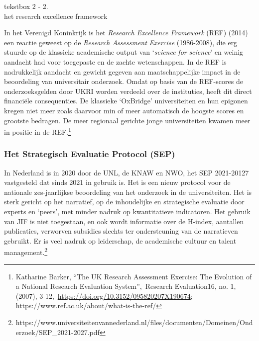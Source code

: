 \documentclass[empirical, authordate, ]{new-jote-article}
\begin{document}
	\begin{bookbox}{\raggedright tekstbox 2 - 2. \\het research excellence framework}
		In het Verenigd Koninkrijk is het \emph{Research Excellence Framework} (REF) (2014) een reactie geweest op de \emph{Research Assessment }\emph{Exercise} (1986-2008), die erg stuurde op de klassieke academische output van ‘\emph{science}\emph{ }\emph{for}\emph{ }\emph{science}' en weinig aandacht had voor toegepaste en de zachte wetenschappen. In de REF is nadrukkelijk aandacht en gewicht gegeven aan maatschappelijke impact in de beoordeling van universitair onderzoek. Omdat op basis van de REF-scores de onderzoeksgelden door UKRI worden verdeeld over de instituties, heeft dit direct financiële consequenties. De klassieke ‘OxBridge' universiteiten en hun epigonen kregen niet meer zoals daarvoor min of meer automatisch de hoogste scores en grootste bedragen. De meer regionaal gerichte jonge universiteiten kwamen meer in positie in de REF.\footnote{Katharine Barker, “The UK Research Assessment Exercise: The Evolution of a National Research Evaluation System”, Research Evaluation16, no. 1, (2007), 3-12, \href{https://doi.org/10.3152/095820207X190674}{https://doi.org/10.3152/095820207X190674}; https://www.ref.ac.uk/about/what-is-the-ref/}
	\end{bookbox}

	\subsubsection{Het Strategisch Evaluatie Protocol (SEP)}



	In Nederland is in 2020 door de UNL, de KNAW en NWO, het SEP 2021-20127 vastgesteld dat sinds 2021 in gebruik is. Het is een nieuw protocol voor de nationale zes-jaarlijkse beoordeling van het onderzoek in de universiteiten. Het is sterk gericht op het narratief, op de inhoudelijke en strategische evaluatie door experts en ‘peers', met minder nadruk op kwantitatieve indicatoren. Het gebruik van JIF is niet toegestaan, en ook wordt informatie over de H-index, aantallen publicaties, verworven subsidies slechts ter ondersteuning van de narratieven gebruikt. Er is veel nadruk op leiderschap, de academische cultuur en talent management.\footnote{https://www.universiteitenvannederland.nl/files/documenten/Domeinen/Onderzoek/SEP\_2021-2027.pdf}
\end{document}
